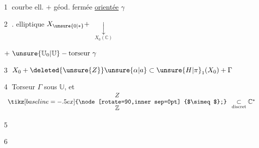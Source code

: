 
\textcircled{1} courbe ell. $+$ géod. fermée \uline{orientée} $\gamma$

\textcircled{2} .  elliptique $X_{\unsure{0|*}}+$ 
$\displaystyle\underset{X_0(\mathbb C)}{\downarrow}$

$+\ \unsure{\mathbb U_0|\mathbb U}-\text{torseur}\ \gamma$

\textcircled{3} $X_0+\deleted{\unsure{Z}}\unsure{\alpha|a}\subset\unsure{H|\pi}_1(X_0)+\Gamma$

\textcircled{4} Torseur $\Gamma$ sous $\mathbb U$, et
$\begin{array}{c}Z\\[-2pt]\tikz[baseline=-.5ex]{\node[rotate=90,inner sep=0pt] {$\simeq$};}\\[-2pt]\mathbb Z\end{array}
\underset{\text{discret}}{\subset}\mathbb C^{*}$

\textcircled{5}

\textcircled{6}
